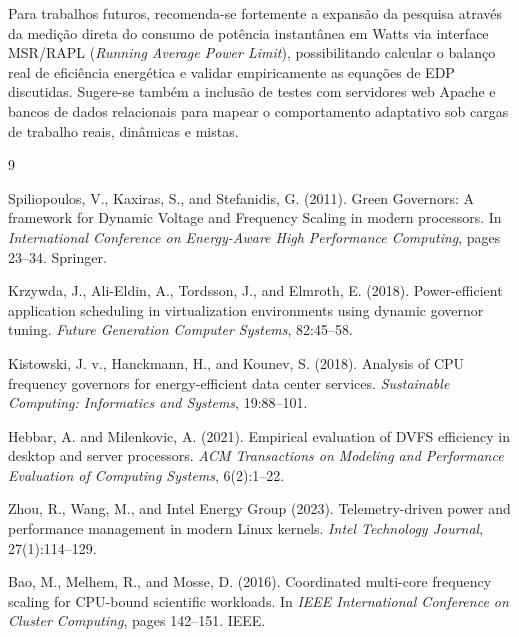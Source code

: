 \documentclass[12pt]{article}
\begin{document}
Para trabalhos futuros, recomenda-se fortemente a expansão da pesquisa através da medição direta do consumo de potência instantânea em Watts via interface MSR/RAPL (\textit{Running Average Power Limit}), possibilitando calcular o balanço real de eficiência energética e validar empiricamente as equações de EDP discutidas. Sugere-se também a inclusão de testes com servidores web Apache e bancos de dados relacionais para mapear o comportamento adaptativo sob cargas de trabalho reais, dinâmicas e mistas.


\begin{thebibliography}{9}

Spiliopoulos, V., Kaxiras, S., and Stefanidis, G. (2011). Green Governors: A framework for Dynamic Voltage and Frequency Scaling in modern processors. In \textit{International Conference on Energy-Aware High Performance Computing}, pages 23--34. Springer.

Krzywda, J., Ali-Eldin, A., Tordsson, J., and Elmroth, E. (2018). Power-efficient application scheduling in virtualization environments using dynamic governor tuning. \textit{Future Generation Computer Systems}, 82:45--58.

Kistowski, J. v., Hanckmann, H., and Kounev, S. (2018). Analysis of CPU frequency governors for energy-efficient data center services. \textit{Sustainable Computing: Informatics and Systems}, 19:88--101.

Hebbar, A. and Milenkovic, A. (2021). Empirical evaluation of DVFS efficiency in desktop and server processors. \textit{ACM Transactions on Modeling and Performance Evaluation of Computing Systems}, 6(2):1--22.

Zhou, R., Wang, M., and Intel Energy Group (2023). Telemetry-driven power and performance management in modern Linux kernels. \textit{Intel Technology Journal}, 27(1):114--129.

Bao, M., Melhem, R., and Mosse, D. (2016). Coordinated multi-core frequency scaling for CPU-bound scientific workloads. In \textit{IEEE International Conference on Cluster Computing}, pages 142--151. IEEE.

\end{thebibliography}
\end{document}
